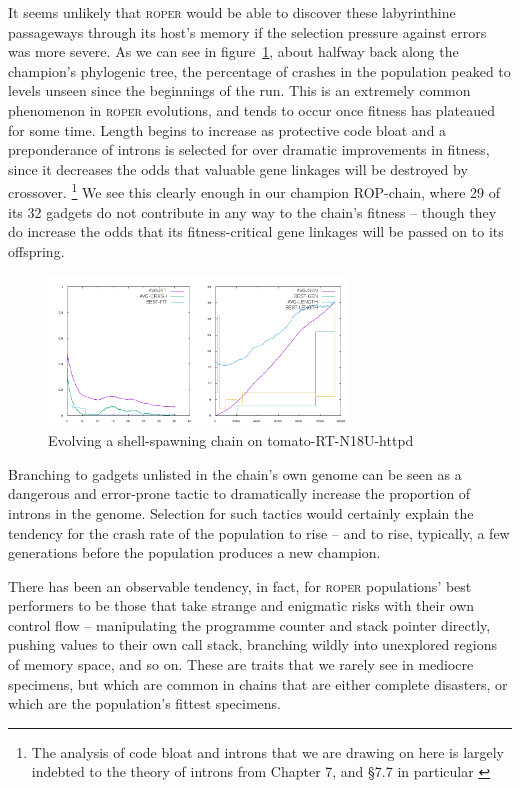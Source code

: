 It seems unlikely that \textsc{roper} would be able to discover
these labyrinthine passageways through its host's memory if the
selection pressure against errors was more severe.
As we can see in figure~\ref{shellpattern-graph}, about halfway
back along the champion's phylogenic tree, the percentage of
crashes in the population peaked to levels unseen since the
beginnings of the run. This is an extremely common phenomenon in
\textsc{roper} evolutions, and tends to occur once fitness has
plateaued for some time. Length begins to increase as protective
code bloat and a preponderance of introns is selected for over
dramatic improvements in fitness, since it decreases the odds
that valuable gene linkages will be destroyed by crossover.%
\footnote{The analysis of code bloat and introns that we are
  drawing on here is largely indebted to the theory of introns from Chapter 7, and \S{7.7} in particular \cite{brameier07}}
We see this clearly enough in our champion ROP-chain,
where 29 of its 32 gadgets do not contribute in any way to the
chain's fitness -- though they do increase the odds that its
fitness-critical gene linkages will be passed on to its
offspring. 
\begin{figure}
  \includegraphics[height=4cm]{examples/shellpattern/shellpattern.png}
  \caption{Evolving a shell-spawning chain on {tomato-RT-N18U-httpd}}
  \label{shellpattern-graph}
\end{figure}


Branching to gadgets unlisted in the chain's own genome can be
seen as a dangerous and error-prone tactic to dramatically
increase the proportion of introns in the genome. Selection for
such tactics would certainly explain the tendency for the crash
rate of the population to rise -- and to rise, typically, a few
generations before the population produces a new champion. 

There has been an observable tendency, in fact, for
\textsc{roper} populations' best performers to be those that take
strange and enigmatic risks with their own control flow --
manipulating the programme counter and stack pointer directly,
pushing values to their own call stack, branching wildly into
unexplored regions of memory space, and so on. These are traits
that we rarely see in mediocre specimens, but which are common in
chains that are either complete disasters, or which are the
population's fittest specimens. 

